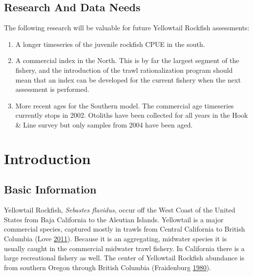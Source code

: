 \documentclass[12pt,]{article}
\begin{document}
\FloatBarrier

\newpage

\subsection*{Research And Data Needs}\label{research-and-data-needs}

The following research will be valuable for future Yellowtail Rockfish
assessments:

\begin{enumerate}

\item A longer timeseries of the juvenile rockfish CPUE in the south.

\item A commercial index in the North.  This is by far the largest segment of the fishery, and the introduction of the trawl rationalization program should mean that an index can be developed for the current fishery when the next assessment is performed.

\item More recent ages for the Southern model.  The commercial age timeseries currently stops in 2002. Otoliths have been collected for all years in the Hook \& Line survey but only samples from 2004 have been aged.


\end{enumerate}

\FloatBarrier

\newpage

\renewcommand{\thefigure}{\arabic{figure}}
\renewcommand{\thetable}{\arabic{table}}

\setcounter{figure}{0} \setcounter{table}{0}

\section{Introduction}\label{introduction}

\subsection{Basic Information}\label{basic-information}

Yellowtail Rockfish, \emph{Sebastes flavidus}, occur off the West Coast
of the United States from Baja California to the Aleutian Islands.
Yellowtail is a major commercial species, captured mostly in trawls from
Central California to British Columbia (Love
\protect\hyperlink{ref-Love2011}{2011}). Because it is an aggregating,
midwater species it is usually caught in the commercial midwater trawl
fishery. In California there is a large recreational fishery as well.
The center of Yellowtail Rockfish abundance is from southern Oregon
through British Columbia (Fraidenburg
\protect\hyperlink{ref-Fraidenburg1980}{1980}).
\end{document}
